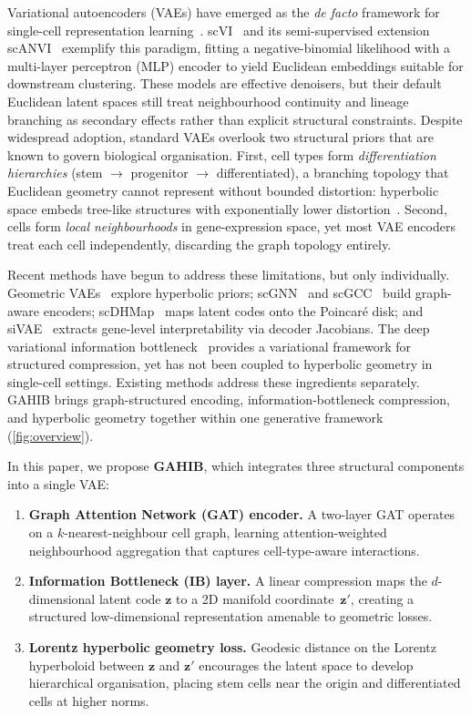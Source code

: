 \documentclass[preprint,12pt]{elsarticle}
\newcommand{\bz}{\mathbf{z}}
\begin{document}
Variational autoencoders (VAEs) have emerged as the \emph{de facto}
framework for single-cell representation
learning~\cite{lopez2018deep,gronbech2020scvae}.
scVI~\cite{lopez2018deep} and its semi-supervised extension
scANVI~\cite{xu2021scanvi} exemplify this paradigm, fitting a
negative-binomial likelihood with a multi-layer perceptron (MLP) encoder to
yield Euclidean embeddings suitable for downstream clustering.
These models are effective denoisers, but their default Euclidean latent
spaces still treat neighbourhood continuity and lineage branching as
secondary effects rather than explicit structural constraints.
Despite widespread adoption, standard VAEs overlook two structural priors
that are known to govern biological organisation.
First, cell types form \emph{differentiation hierarchies}
(stem $\to$ progenitor $\to$ differentiated), a branching topology that
Euclidean geometry cannot represent without bounded distortion:
hyperbolic space embeds tree-like structures with exponentially lower
distortion~\cite{nickel2017poincare,ganea2018hyperbolic}.
Second, cells form \emph{local neighbourhoods} in gene-expression space,
yet most VAE encoders treat each cell independently, discarding the graph
topology entirely.

Recent methods have begun to address these limitations, but only
individually.
Geometric VAEs~\cite{bayer2023gmvae} explore hyperbolic priors;
scGNN~\cite{wang2021scgnn} and scGCC~\cite{tian2023scgcc} build
graph-aware encoders;
scDHMap~\cite{tian2023scdhmap} maps latent codes onto the Poincar\'{e}
disk;
and siVAE~\cite{choi2023sivae} extracts gene-level interpretability via
decoder Jacobians.
The deep variational information bottleneck~\cite{alemi2017deep} provides
a variational framework for structured compression, yet has not been
coupled to hyperbolic geometry in single-cell settings.
Existing methods address these ingredients separately.
GAHIB brings graph-structured encoding, information-bottleneck
compression, and hyperbolic geometry together within one generative
framework (\cref{fig:overview}).

In this paper, we propose \textbf{GAHIB}, which integrates three
structural components into a single VAE:
\begin{enumerate}[leftmargin=*,itemsep=2pt]
\item \textbf{Graph Attention Network (GAT) encoder.}
  A two-layer GAT operates on a $k$-nearest-neighbour cell graph,
  learning attention-weighted neighbourhood aggregation that captures
  cell-type-aware interactions.
\item \textbf{Information Bottleneck (IB) layer.}
  A linear compression maps the $d$-dimensional latent code $\bz$ to a
  2D manifold coordinate~$\bz'$, creating a structured low-dimensional
  representation amenable to geometric losses.
\item \textbf{Lorentz hyperbolic geometry loss.}
  Geodesic distance on the Lorentz hyperboloid between $\bz$ and $\bz'$
  encourages the latent space to develop hierarchical organisation,
  placing stem cells near the origin and differentiated cells at higher
  norms.
\end{enumerate}
\end{document}

